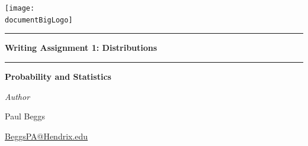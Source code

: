 \documentclass[12pt]{article}
\newcommand{\documentBigLogo}{../../images/Hendrix Logo.png}
\newcounter{BoxCounter}
\begin{document}



\newcommand{\assignmentname}{Writing Assignment 1: Distributions}

\newcommand{\cussubtitle}{Probability and Statistics}
\newcommand{\finaldate}{September 17, 2025}
\newcommand{\professor}{Prof.\ Lars Seme, M.S.}


\begin{titlepage}
    \begin{center}

        \vspace*{-2cm}
        \texttt{[image: \\documentBigLogo]}\\
        \vfill

        \textcolor{horange}{\rule{\textwidth}{1.0pt}}

        \vspace{2em}

        {\huge \textbf{\assignmentname}}

        \vspace{1em} %

        \textcolor{horange}{\rule{\textwidth}{1.0pt}}

        \vspace*{1\baselineskip}

        {\LARGE \textbf{\cussubtitle}}

        \begin{large}
            \vspace*{5\baselineskip}

            \vspace*{1\baselineskip}

            \emph{Author} \\[1ex]
            {\Large Paul Beggs \\ \par} %
            {\href{mailto:BeggsPA@Hendrix.edu}{{BeggsPA@Hendrix.edu}}}\\ %


\end{large}
\end{center}
\end{titlepage}
\end{document}
